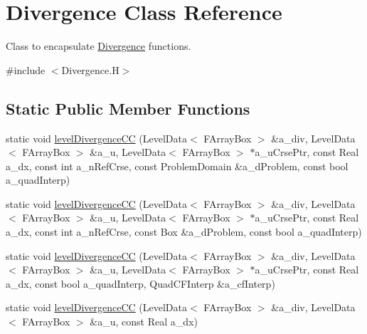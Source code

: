 \hypertarget{class_divergence}{\section{Divergence Class Reference}
\label{class_divergence}
}


Class to encapsulate \hyperlink{class_divergence}{Divergence} functions.  




{\ttfamily \#include $<$Divergence.\-H$>$}

\subsection*{Static Public Member Functions}
\begin{DoxyCompactItemize}
\item 
static void \hyperlink{class_divergence_a85ddcbfb1ed4cd7e6624c33d0bd918f3}{level\-Divergence\-C\-C} (Level\-Data$<$ F\-Array\-Box $>$ \&a\-\_\-div, Level\-Data$<$ F\-Array\-Box $>$ \&a\-\_\-u, Level\-Data$<$ F\-Array\-Box $>$ $\ast$a\-\_\-u\-Crse\-Ptr, const Real a\-\_\-dx, const int a\-\_\-n\-Ref\-Crse, const Problem\-Domain \&a\-\_\-d\-Problem, const bool a\-\_\-quad\-Interp)
\item 
static void \hyperlink{class_divergence_a832809fde8a4344564e82a2a4881dccb}{level\-Divergence\-C\-C} (Level\-Data$<$ F\-Array\-Box $>$ \&a\-\_\-div, Level\-Data$<$ F\-Array\-Box $>$ \&a\-\_\-u, Level\-Data$<$ F\-Array\-Box $>$ $\ast$a\-\_\-u\-Crse\-Ptr, const Real a\-\_\-dx, const int a\-\_\-n\-Ref\-Crse, const Box \&a\-\_\-d\-Problem, const bool a\-\_\-quad\-Interp)
\item 
static void \hyperlink{class_divergence_a8714fec933884a4b9e6f8173e22574e3}{level\-Divergence\-C\-C} (Level\-Data$<$ F\-Array\-Box $>$ \&a\-\_\-div, Level\-Data$<$ F\-Array\-Box $>$ \&a\-\_\-u, Level\-Data$<$ F\-Array\-Box $>$ $\ast$a\-\_\-u\-Crse\-Ptr, const Real a\-\_\-dx, const bool a\-\_\-quad\-Interp, Quad\-C\-F\-Interp \&a\-\_\-cf\-Interp)
\item 
\hypertarget{class_divergence_ae2ca2377231f1c6a272151d3ffe95432}{static void \hyperlink{class_divergence_ae2ca2377231f1c6a272151d3ffe95432}{level\-Divergence\-C\-C} (Level\-Data$<$ F\-Array\-Box $>$ \&a\-\_\-div, Level\-Data$<$ F\-Array\-Box $>$ \&a\-\_\-u, const Real a\-\_\-dx)}\label{class_divergence_ae2ca2377231f1c6a272151d3ffe95432}


\end{DoxyCompactItemize}
